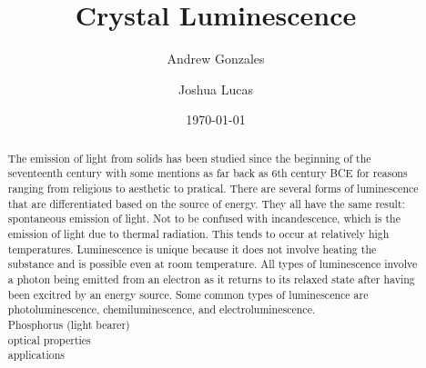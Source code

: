 \documentclass[prl,onecolumn]{revtex4-1}  %
\begin{document}

\title{Crystal Luminescence }

\author{Andrew Gonzales}

\author{Joshua Lucas}


\date{\today}

\begin{abstract}
The emission of light from solids has been studied since the beginning of the seventeenth century with some mentions as far back as 6th century BCE %
for reasons ranging from religious to aesthetic to pratical. There are several forms of luminescence that are differentiated based on the source of energy. They all have the same result: spontaneous emission of light. Not to be confused with incandescence, which is the emission of light due to thermal radiation. This tends to occur at relatively high temperatures. Luminescence is unique because it does not involve heating the substance and is possible even at room temperature. All types of luminescence involve a photon being emitted from an electron as it returns to its relaxed state after having been excitred by an energy source. Some common types of luminescence are photoluminescence, chemiluminescence, and electroluminescence. 
\\Phosphorus (light bearer)  
\\optical properties
\\applications



\end{abstract}

\maketitle %
\end{document}
